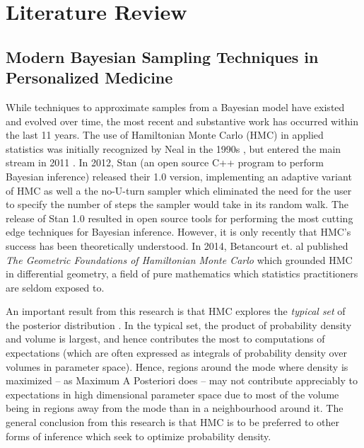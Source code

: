 \chapter{Literature Review}

\section{Modern Bayesian Sampling Techniques in Personalized Medicine}

While techniques to approximate samples from a Bayesian model have existed and evolved over time, the most recent and substantive work has occurred within the last 11 years.  The use of Hamiltonian Monte Carlo (HMC) in applied statistics was initially recognized by Neal in the 1990s \cite{Neal1996-vn}, but entered the main stream in 2011 \cite{neal2011mcmc}.  In 2012, Stan (an open source C++ program to perform Bayesian inference) released their 1.0 version, implementing an adaptive variant of HMC \cite{neal2011mcmc} as well a the no-U-turn sampler \cite{hoffman2014no} which eliminated the need for the user to specify the number of steps the sampler would take in its random walk.  The release of Stan 1.0 resulted in open source tools for performing the most cutting edge techniques for Bayesian inference.  However, it is only recently that HMC's success has been theoretically understood.  In 2014, Betancourt et. al published \textit{The Geometric Foundations of Hamiltonian Monte Carlo} \cite{betancourt2017geometric} which grounded HMC in differential geometry, a field of pure mathematics which statistics practitioners are seldom exposed to.

An important result from this research is that HMC explores the \textit{typical set} of the posterior distribution \cite{Betancourt2017-ak}.  In the typical set, the product of probability density and volume is largest, and hence contributes the most to computations of expectations (which are often expressed as integrals of probability density over volumes in parameter space).  Hence, regions around the mode where density is maximized -- as Maximum A Posteriori does -- may not contribute appreciably to expectations in high dimensional parameter space due to most of the volume being in regions away from the mode than in a neighbourhood around it.  The general conclusion from this research is that HMC is to be preferred to other forms of inference which seek to optimize probability density. 

